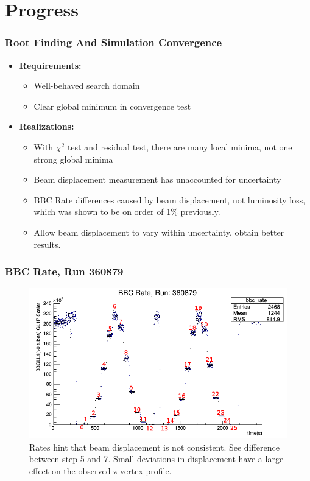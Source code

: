 \section{Progress}
\label{sec:progress}

\begin{frame}
  \frametitle{Root Finding And Simulation Convergence}
  \begin{itemize}
  \item \textbf{Requirements:}
    \begin{itemize}
    \item Well-behaved search domain 
    \item Clear global minimum in convergence test
    \end{itemize}
  \item \textbf{Realizations:}
    \begin{itemize}
    \item With $\chi^2$ test and residual test, there are many local minima, not
      one strong global minima
    \item Beam displacement measurement has unaccounted for uncertainty
    \item BBC Rate differences caused by beam displacement, not luminosity loss,
      which was shown to be on order of 1\% previously.
    \item Allow beam displacement to vary within uncertainty, obtain better
      results.
    \end{itemize}
  \end{itemize}
\end{frame}

\begin{frame}
  \frametitle{BBC Rate, Run 360879}
  \begin{figure}
    \includegraphics[width=0.9\linewidth]{"./figures/bbc_rate_360879_labeled_steps"}
    \caption{
      Rates hint that beam displacement is not consistent. See difference
      between step 5 and 7. Small deviations in displacement have a large
      effect on the observed z-vertex profile.
    }
    \label{fig:run_360879}
  \end{figure}
\end{frame}

